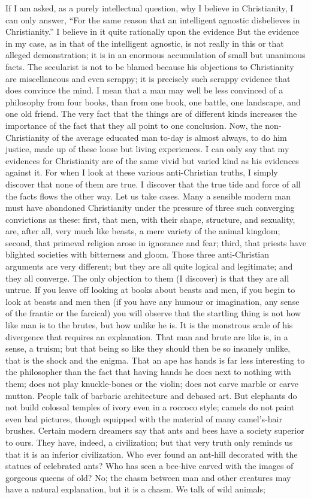If I am asked, as a purely intellectual question, why I believe in Christianity, I can only answer, “For the same reason that an intelligent agnostic disbelieves in Christianity.” I believe in it quite rationally upon the evidence But the evidence in my case, as in that of the intelligent agnostic, is not really in this or that alleged demonstration; it is in an enormous accumulation of small but unanimous facts. The secularist is not to be blamed because his objections to Christianity are miscellaneous and even scrappy; it is precisely such scrappy evidence that does convince the mind. I mean that a man may well be less convinced of a philosophy from four books, than from one book, one battle, one landscape, and one old friend. The very fact that the things are of different kinds increases the importance of the fact that they all point to one conclusion. Now, the non-Christianity of the average educated man to-day is almost always, to do him justice, made up of these loose but living experiences. I can only say that my evidences for Christianity are of the same vivid but varied kind as his evidences against it. For when I look at these various anti-Christian truths, I simply discover that none of them are true. I discover that the true tide and force of all the facts flows the other way. Let us take cases. Many a sensible modern man must have abandoned Christianity under the pressure of three such converging convictions as these: first, that men, with their shape, structure, and sexuality, are, after all, very much like beasts, a mere variety of the animal kingdom; second, that primeval religion arose in ignorance and fear; third, that priests have blighted societies with bitterness and gloom. Those three anti-Christian arguments are very different; but they are all quite logical and legitimate; and they all converge. The only objection to them (I discover) is that they are all untrue. If you leave off looking at books about beasts and men, if you begin to look at beasts and men then (if you have any humour or imagination, any sense of the frantic or the farcical) you will observe that the startling thing is not how like man is to the brutes, but how unlike he is. It is the monstrous scale of his divergence that requires an explanation. That man and brute are like is, in a sense, a truism; but that being so like they should then be so insanely unlike, that is the shock and the enigma. That an ape has hands is far less interesting to the philosopher than the fact that having hands he does next to nothing with them; does not play knuckle-bones or the violin; does not carve marble or carve mutton. People talk of barbaric architecture and debased art. But elephants do not build colossal temples of ivory even in a roccoco style; camels do not paint even bad pictures, though equipped with the material of many camel’s-hair brushes. Certain modern dreamers say that ants and bees have a society superior to ours. They have, indeed, a civilization; but that very truth only reminds us that it is an inferior civilization. Who ever found an ant-hill decorated with the statues of celebrated ants? Who has seen a bee-hive carved with the images of gorgeous queens of old? No; the chasm between man and other creatures may have a natural explanation, but it is a chasm. We talk of wild animals; 
